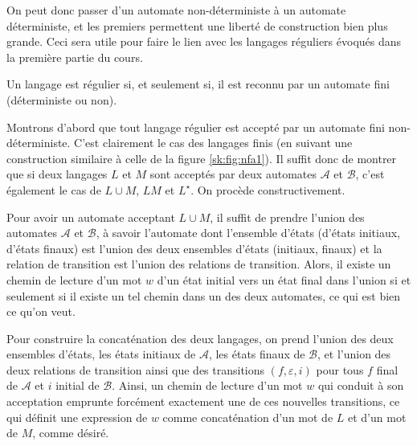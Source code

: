 On peut donc passer d'un automate non-déterministe à un automate déterministe, et les premiers permettent une liberté de construction bien plus grande. Ceci sera utile pour faire le lien avec les langages réguliers évoqués dans la première partie du cours.

\begin{thm}[Kleene, 1951]
Un langage est régulier si, et seulement si, il est reconnu par un automate fini (déterministe ou non).
\end{thm}

\begin{preuve}
Montrons d'abord que tout langage régulier est accepté par un automate fini non-déterministe. C'est clairement le cas des langages finis (en suivant une construction similaire à celle de la figure \ref{sk:fig:nfa1}). Il suffit donc de montrer que si deux langages $L$ et $M$ sont acceptés par deux automates $\mathcal{A}$ et $\mathcal{B}$, c'est également le cas de $L\cup M$, $LM$ et $L^\star$. On procède constructivement.

Pour avoir un automate acceptant $L\cup M$, il suffit de prendre l'union des automates $\mathcal{A}$ et $\mathcal{B}$, à savoir l'automate dont l'ensemble d'états (d'états initiaux, d'états finaux) est l'union des deux ensembles d'états (initiaux, finaux) et la relation de transition est l'union des relations de transition. Alors, il existe un chemin de lecture d'un mot $w$ d'un état initial vers un état final dans l'union si et seulement si il existe un tel chemin dans un des deux automates, ce qui est bien ce qu'on veut.

Pour construire la concaténation des deux langages, on prend l'union des deux ensembles d'états, les états initiaux de $\mathcal{A}$, les états finaux de $\mathcal{B}$, et l'union des deux relations de transition ainsi que des transitions $(f,\varepsilon,i)$ pour tous $f$ final de $\mathcal{A}$ et $i$ initial de $\mathcal{B}$. Ainsi, un chemin de lecture d'un mot $w$ qui conduit à son acceptation emprunte forcément exactement une de ces nouvelles transitions, ce qui définit une expression de $w$ comme concaténation d'un mot de $L$ et d'un mot de $M$, comme désiré.


\end{preuve}

